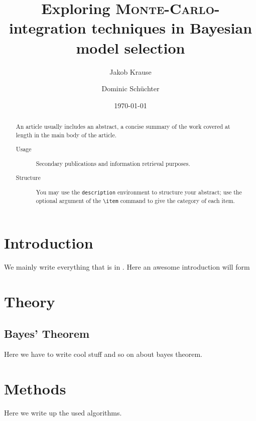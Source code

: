 \documentclass[%
 reprint,
 amsmath,amssymb,
 aps,
]{revtex4-1}
\begin{document}
\title{Exploring \textsc{Monte-Carlo}-integration techniques in Bayesian model selection}%

\author{Jakob Krause}
\author{Dominic Schüchter}

\date{\today}%

\begin{abstract}
  An article usually includes an abstract, a concise summary of the work
  covered at length in the main body of the article.
  \begin{description}
  \item[Usage]
    Secondary publications and information retrieval purposes.
  \item[Structure]
    You may use the \texttt{description} environment to structure your abstract;
    use the optional argument of the \verb+\item+ command to give the category of each item.
  \end{description}
\end{abstract}
\maketitle


\section{\label{sec:level1}Introduction}
We mainly write everything that is in \cite{sivia}. Here an awesome introduction will form
\section{Theory}

\subsection{Bayes' Theorem}
Here we have to write cool stuff and so on about bayes theorem.
\section{Methods}
Here we write up the used algorithms.
\end{document}
